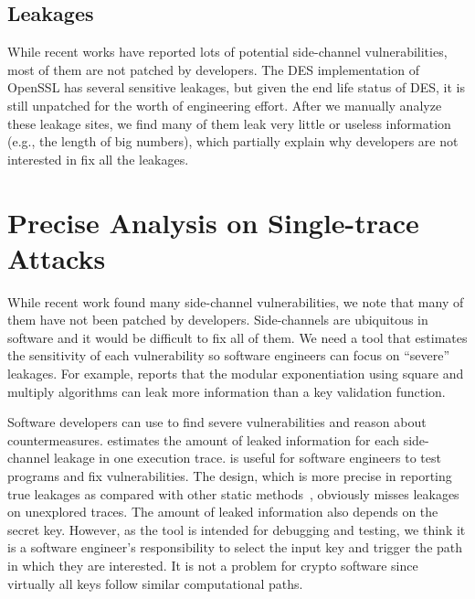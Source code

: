 \subsection*{Leakages} While recent works have reported lots of potential side-channel vulnerabilities, most of them are not patched by developers. The DES implementation of OpenSSL has several sensitive leakages, but given the end life status of DES, it is still unpatched for the worth of engineering effort. After we manually analyze these leakage sites, we find many of them leak very little or useless information (e.g., the length of big numbers), which partially explain why developers are not interested in fix all the leakages. 
\section{Precise Analysis on Single-trace Attacks}
While recent work found many side-channel vulnerabilities,
we note that many of them have not been patched by developers.
Side-channels are ubiquitous in software and it would be difficult to fix all of them.
We need a tool that estimates the sensitivity of each vulnerability
so software engineers can focus on
``severe'' leakages. For example, \tool{} reports that
the modular exponentiation using square and multiply algorithms can
leak more information than a key validation function.

Software developers can use \tool{} to find severe vulnerabilities
and reason about countermeasures.
\tool{} estimates the amount of leaked information for each side-channel leakage
in one execution trace. \tool{} is useful for software
engineers to test programs and fix vulnerabilities.
The design, which is more precise in reporting true leakages as compared with other static
methods~\cite{197207,BacelarAlmeida:2013:FVS:2483313.2483334}, obviously misses
leakages on unexplored traces. The amount of leaked information also depends on the secret key.
However, as the tool is intended for debugging and testing,
we think it is a software engineer's responsibility to select the input key and trigger
the path in which they are interested. It is not a problem for crypto software
since virtually all keys follow similar computational paths.

